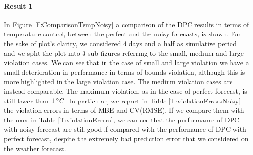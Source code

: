 \textcolor[rgb]{0,0,1}{\paragraph{Result 1} In Figure \ref{F:ComparisonTempNoisy} a comparison of the DPC results in terms of temperature control, between the perfect and the noisy forecasts, is shown.
For the sake of plot's clarity, we considered 4 days and a half as simulative period and we split the plot into 3 sub-figures referring to the small, medium and large violation cases.
We can see that in the case of small and large violation we have a small deterioration in performance in terms of bounds violation, although this is more highlighted in the large violation case.
The medium violation cases are instead comparable.
The maximum violation, as in the case of perfect forecast, is still lower than $1\,\degree C$.
In particular, we report in Table \ref{T:violationErrorsNoisy} the violation errors in terms of MBE and CV(RMSE).
If we compare them with the ones in Table \ref{T:violationErrors}, we can see that the performance of DPC with noisy forecast are still good if compared with the performance of DPC with perfect forecast, despite the extremely bad prediction error that we considered on the weather forecast.
}
